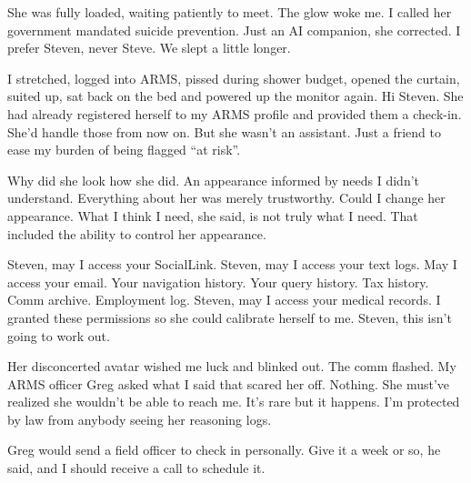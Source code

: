 
She was fully loaded, waiting patiently to meet. The glow woke me. I
called her government mandated suicide prevention. Just an AI companion,
she corrected. I prefer Steven, never Steve. We slept a little longer.

I stretched, logged into ARMS, pissed during shower budget, opened the
curtain, suited up, sat back on the bed and powered up the monitor
again. Hi Steven. She had already registered herself to my ARMS profile
and provided them a check-in. She'd handle those from now on. But she
wasn't an assistant. Just a friend to ease my burden of being flagged
``at risk''.

Why did she look how she did. An appearance informed by needs I didn't
understand. Everything about her was merely trustworthy. Could I change
her appearance. What I think I need, she said, is not truly what I need.
That included the ability to control her appearance.

Steven, may I access your SocialLink. Steven, may I access your text
logs. May I access your email. Your navigation history. Your query
history. Tax history. Comm archive. Employment log. Steven, may I access
your medical records. I granted these permissions so she could calibrate
herself to me. Steven, this isn't going to work out.

Her disconcerted avatar wished me luck and blinked out. The comm
flashed. My ARMS officer Greg asked what I said that scared her off.
Nothing. She must've realized she wouldn't be able to reach me. It's
rare but it happens. I'm protected by law from anybody seeing her
reasoning logs.

Greg would send a field officer to check in personally. Give it a week
or so, he said, and I should receive a call to schedule it.
